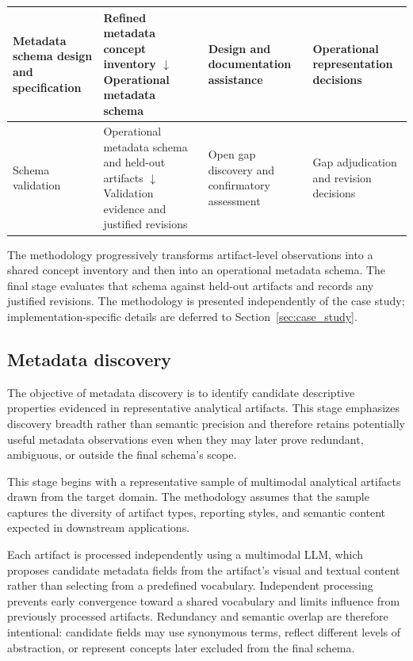 \documentclass{article}
\begin{document}
\begin{table}[!ht]
\begin{tabularx}{\textwidth}{Y{0.9} Y{1.25} Y{0.9} Y{0.95}}
    \midrule

    Metadata schema design and specification &
    Refined metadata concept inventory \newline $\downarrow$ \newline Operational metadata schema &
    Design and documentation assistance &
    Operational representation decisions \\

    \midrule

    Schema validation &
    Operational metadata schema and held-out artifacts \newline $\downarrow$ \newline Validation evidence and justified revisions &
    Open gap discovery and confirmatory assessment &
    Gap adjudication and revision decisions \\

    \bottomrule
    \end{tabularx}
\end{table}

The methodology progressively transforms artifact-level observations into a shared concept inventory and then into an operational metadata schema. The final stage evaluates that schema against held-out artifacts and records any justified revisions. The methodology is presented independently of the case study; implementation-specific details are deferred to Section~\ref{sec:case_study}.

\subsection{Metadata discovery}

The objective of metadata discovery is to identify candidate descriptive properties evidenced in representative analytical artifacts. This stage emphasizes discovery breadth rather than semantic precision and therefore retains potentially useful metadata observations even when they may later prove redundant, ambiguous, or outside the final schema's scope.

This stage begins with a representative sample of multimodal analytical artifacts drawn from the target domain. The methodology assumes that the sample captures the diversity of artifact types, reporting styles, and semantic content expected in downstream applications.

Each artifact is processed independently using a multimodal LLM, which proposes candidate metadata fields from the artifact's visual and textual content rather than selecting from a predefined vocabulary. Independent processing prevents early convergence toward a shared vocabulary and limits influence from previously processed artifacts. Redundancy and semantic overlap are therefore intentional: candidate fields may use synonymous terms, reflect different levels of abstraction, or represent concepts later excluded from the final schema.
\end{document}
